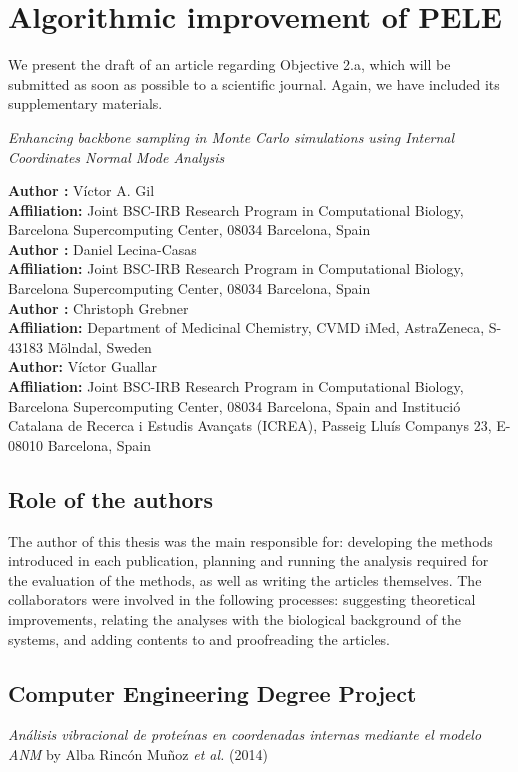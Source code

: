 \section{Algorithmic improvement of PELE}
We present the draft of an article regarding Objective 2.a, which will be submitted as soon as possible to a scientific journal. Again, we have included its supplementary materials.

\noindent
\parbox{\dimexpr\linewidth-2\fboxsep-2\fboxrule}{
\begin{center}
\textit{Enhancing backbone sampling in Monte Carlo simulations using Internal Coordinates Normal Mode Analysis}
\end{center}
\medskip
\textbf{Author :} V\'ictor A. Gil\\ 
\textbf{Affiliation:} Joint BSC-IRB Research Program in Computational Biology, Barcelona Supercomputing Center, 08034 Barcelona, Spain\\
\medskip
\textbf{Author :} Daniel Lecina-Casas\\ 
\textbf{Affiliation:} Joint BSC-IRB Research Program in Computational Biology, Barcelona Supercomputing Center, 08034 Barcelona, Spain\\
\medskip
\textbf{Author :} Christoph Grebner\\ 
\textbf{Affiliation:} Department of Medicinal Chemistry, CVMD iMed, AstraZeneca, S-43183 M\"olndal, Sweden\\
\medskip
\textbf{Author:} V\'ictor Guallar\\
\textbf{Affiliation:} Joint BSC-IRB Research Program in Computational Biology, Barcelona Supercomputing Center, 08034 Barcelona, Spain and Instituci\'o Catalana de Recerca i Estudis Avan\c{c}ats (ICREA), Passeig Llu\'is Companys 23, E-08010 Barcelona, Spain\\
}
\medskip

\subsection{Role of the authors}
The author of this thesis was the main responsible for: developing the methods introduced in each publication, planning and running the analysis required for the evaluation of the methods, as well as writing the articles themselves. The collaborators were involved in the following processes: suggesting theoretical improvements, relating the analyses with the biological background of the systems, and adding contents to and proofreading the articles. 

\subsection{Computer Engineering Degree Project}
\textit{An\'alisis vibracional de prote\' inas en coordenadas internas mediante el modelo ANM} by Alba Rinc\'on Mu\~noz \textit{et al.} \cite{rincon_munoz_alisis_2014} (2014)

